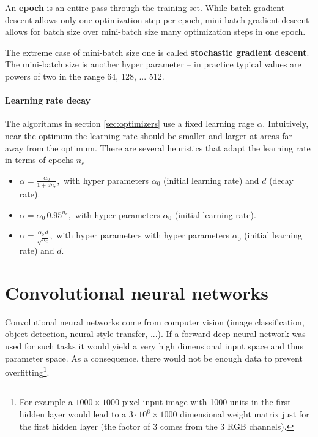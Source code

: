 \documentclass[12pt,a4paper]{article}
\begin{document}
An \textbf{epoch} is an entire pass through the training set. While batch gradient descent allows only one optimization step per epoch, mini-batch gradient descent allows for batch size over mini-batch size many optimization steps in one epoch. 

The extreme case of mini-batch size one is called \textbf{stochastic gradient descent}. The mini-batch size is another hyper parameter -- in practice typical values are powers of two in the range 64, 128, ... 512.

\paragraph{Learning rate decay} The algorithms in section  \ref{sec:optimizers} use a fixed learning rage $\alpha$. Intuitively, near the optimum the learning rate should be smaller and larger at areas far away from the optimum. There are several heuristics that adapt the learning rate in terms of epochs $n_e$
\begin{itemize}\setlength\itemsep{0em}
	 \item 
	 	  $ \alpha = \frac{\alpha_0}{1+ d n_e}, $ with hyper parameters $\alpha_0$ (initial learning rate) and $d$ (decay rate).
	 \item $ \alpha = \alpha_0\,0.95^{n_e}, $ with hyper parameters $\alpha_0$ (initial learning rate).
	 \item  $ \alpha = \frac{\alpha_0\,d}{\sqrt{n_e}}, $ with hyper parameters with hyper parameters $\alpha_0$ (initial learning rate) and $d$.
	 	  
\end{itemize} 


\section{Convolutional neural networks}
Convolutional neural networks come from computer vision (image classification, object detection, neural style transfer, ...). If a forward deep neural network was used for such tasks it would yield a very high dimensional input space and thus parameter space. As a consequence, there would not be enough data to prevent overfitting\footnote{For example a $1000\times 1000$ pixel input image with 1000 units in the first hidden layer would lead to a $3\cdot10^6 \times 1000$ dimensional weight matrix just for the first hidden layer (the factor of 3 comes from the 3 RGB channels).}. 
\end{document}
